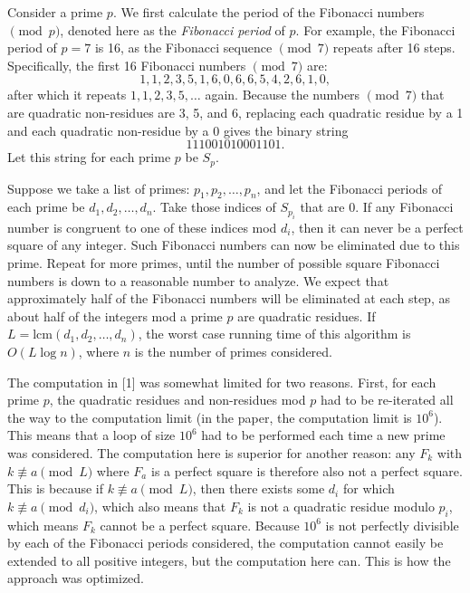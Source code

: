 \documentclass[11pt]{article}
\begin{document}

Consider a prime $p$. We first calculate the period of the Fibonacci numbers $\pmod p$, denoted here as the \textit{Fibonacci period} of $p$. For example, the Fibonacci period of $p = 7$ is 16, as the Fibonacci sequence $\pmod 7$ repeats after 16 steps. Specifically, the first 16 Fibonacci numbers $\pmod{7}$ are: \[ 1, 1, 2, 3, 5, 1, 6, 0, 6, 6, 5, 4, 2, 6, 1, 0, \] after which it repeats $1, 1, 2, 3, 5, \dots$ again. Because the numbers $\pmod{7}$ that are quadratic non-residues are 3, 5, and 6, replacing each quadratic residue by a 1 and each quadratic non-residue by a 0 gives the binary string \[111001010001101.\] Let this string for each prime $p$ be $S_p$. 

Suppose we take a list of primes: $p_1, p_2, \dots , p_n$, and let the Fibonacci periods of each prime be $d_1, d_2, \dots , d_n$. Take those indices of $S_{p_i}$ that are 0. If any Fibonacci number is congruent to one of these indices mod $d_i$, then it can never be a perfect square of any integer. Such Fibonacci numbers can now be eliminated due to this prime. Repeat for more primes, until the number of possible square Fibonacci numbers is down to a reasonable number to analyze. We expect that approximately half of the Fibonacci numbers will be eliminated at each step, as about half of the integers mod a prime $p$ are quadratic residues. If $L = \text{lcm}(d_1,d_2,\dots,d_n)$, the worst case running time of this algorithm is $O(L\log n)$, where $n$ is the number of primes considered.

The computation in [1] was somewhat limited for two reasons. First, for each prime $p$, the quadratic residues and non-residues mod $p$ had to be re-iterated all the way to the computation limit (in the paper, the computation limit is $10^6$). This means that a loop of size $10^6$ had to be performed each time a new prime was considered. The computation here is superior for another reason: any $F_k$ with $k \not\equiv a \pmod L$ where $F_a$ is a perfect square is therefore also not a perfect square. This is because if $k \not\equiv a \pmod L$, then there exists some $d_i$ for which $k \not\equiv a \pmod d_i$, which also means that $F_k$ is not a quadratic residue modulo $p_i$, which means $F_k$ cannot be a perfect square. Because $10^6$ is not perfectly divisible by each of the Fibonacci periods considered, the computation cannot easily be extended to all positive integers, but the computation here can. This is how the approach was optimized.
\end{document}
